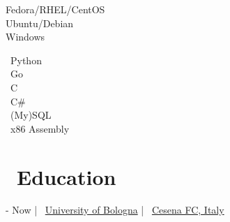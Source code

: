 \documentclass{article}
\begin{document}
\begin{paracol}{2}
\begin{tcolorbox}[title=\faServer \ Operating Systems,colback=white,arc=0pt]
    \textcolor[HTML]{EE0000}{\faRedhat} Fedora/RHEL/CentOS \\[4pt]
    \textcolor[HTML]{E95420}{\faUbuntu} Ubuntu/Debian \\[4pt]
    \textcolor[HTML]{0078D6}{\faWindows} Windows
\end{tcolorbox}

\begin{tcolorbox}[title=\faCode \ Programming,colback=white,arc=0pt]
    \faPython \ Python \\[4pt]
    \faGoogle \ Go \\[4pt]
    \faFileCode \ C \\[4pt]
    \faMicrosoft \ C\# \\[4pt]
    \faDatabase \ (My)SQL \\[4pt]
    \faMicrochip \ x86 Assembly
\end{tcolorbox}

\vspace{50pt}
\begin{center}
    \hypersetup{urlcolor=black}
\end{center}
\vspace{50pt}

\switchcolumn

\maketitle

%
%

\vfill

\section*{\faGraduationCap \ Education}

\begin{tcolorbox}[
    title=\faBookOpen \ \href
        {https://corsi.unibo.it/1cycle/ComputerScienceEngineering}
        {Bachelor in Computer Science and Engineering}
    ,
    colback=white,
    arc=0pt
]
     - Now \hfill | \hfill
    \faUniversity \ \href{https://www.unibo.it/en/}{University of Bologna} \hfill | \hfill
    \faCity \ \href{https://www.openstreetmap.org/relation/9713588}{Cesena FC, Italy}
\end{tcolorbox}


\end{paracol}
\end{document}
